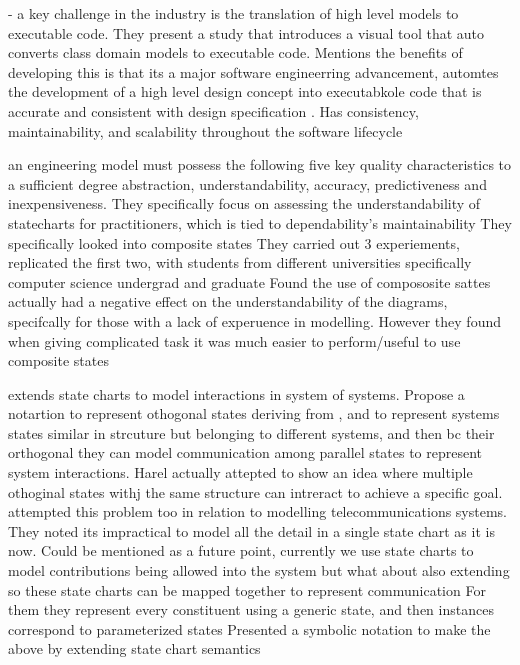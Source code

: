 





\cite{alsarraj2026bridging} - 
a key challenge in the industry is the translation of high level models to executable code. They present a study that introduces a visual tool that auto converts class domain models to executable code. Mentions the benefits of developing this is that its a major software engineerring advancement, automtes the development of a high level design concept into executabkole code that is accurate and consistent with design specification . Has consistency, maintainability, and scalability throughout the software lifecycle




\cite{cruz2009assessing}
an engineering model must possess the following five key
quality characteristics to a sufficient degree \cite{selic2003pragmatics} abstraction, understandability,
accuracy, predictiveness and inexpensiveness. They specifically focus on assessing the understandability of statecharts for practitioners, which is tied to dependability's maintainability
They specifically looked into composite states
They carried out 3 experiements, replicated the first two, with students from different universities specifically computer science undergrad and graduate
Found the use of compososite sattes actually had a negative effect on the understandability of the diagrams, specifcally for those with a lack of experuence in modelling. However they found when giving complicated task it was much easier to perform/useful to use composite states



\cite{ramos2015extending}
extends state charts to model interactions in system of systems. Propose a notartion to represent othogonal states deriving from \cite{harel1987statecharts}, and to represent systems states similar in strcuture but belonging to different systems, and then bc their orthogonal they can model communication among parallel states to represent system interactions. Harel actually attepted to show an idea where multiple othoginal states withj the same structure can intreract to achieve a specific goal. \cite{zave2002component} attempted this problem too in relation to modelling telecommunications systems. They noted its impractical to model all the detail in a single state chart as it is now.
Could be mentioned as a future point, currently we use state charts to model contributions being allowed into the system but what about also extending so these state charts can be mapped together to represent communication
For them they represent every constituent using a generic state, and then instances correspond to parameterized states
Presented a symbolic notation to make the above by extending state chart semantics